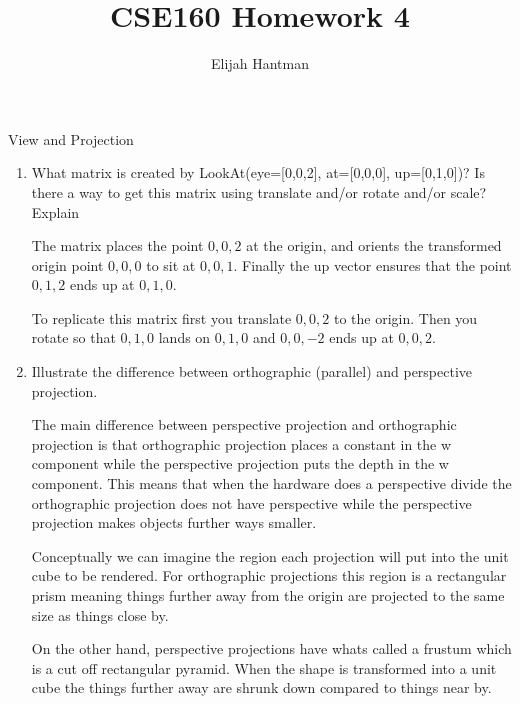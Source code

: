 \documentclass{article}
\title{CSE160 Homework 4}
\author{Elijah Hantman}
\begin{document}
    \maketitle

    {\large View and Projection}
    \begin{enumerate}
        \item What matrix is created by LookAt(eye=[0,0,2], at=[0,0,0], up=[0,1,0])? Is there a
            way to get this matrix using translate and/or rotate and/or scale? Explain

            \begin{mdframed}
               The matrix places the point $0,0,2$ at the origin,
               and orients the transformed origin point $0,0,0$ to
               sit at $0,0,1$. Finally the up vector ensures
               that the point $0,1,2$ ends up at $0,1,0$.


               To replicate this matrix first you translate $0,0,2$
               to the origin. Then you rotate so that $0,1,0$ lands
               on $0,1,0$ and $0,0,-2$ ends up at $0,0,2$.
            \end{mdframed}

        \item Illustrate the difference between orthographic (parallel) and perspective projection.
            \begin{mdframed}
                The main difference between perspective projection
                and orthographic projection is that orthographic projection
                places a constant in the w component while the perspective
                projection puts the depth in the w component. This means
                that when the hardware does a perspective divide the orthographic
                projection does not have perspective while the perspective projection
                makes objects further ways smaller.

                Conceptually we can imagine the region each projection will
                put into the unit cube to be rendered. For orthographic projections
                this region is a rectangular prism meaning things further away
                from the origin are projected to the same size as things close by.

                On the other hand, perspective projections have whats called
                a frustum which is a cut off rectangular pyramid. When the shape
                is transformed into a unit cube the things further away are shrunk
                down compared to things near by.
            \end{mdframed}


\end{enumerate}
\end{document}
